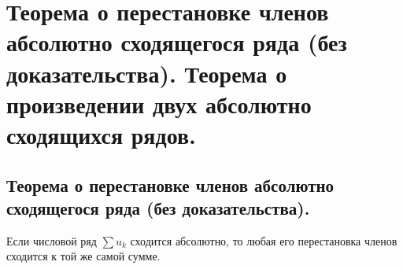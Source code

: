 \section{Теорема о перестановке членов абсолютно сходящегося ряда (без доказательства). Теорема о произведении двух абсолютно сходящихся рядов.}

\subsection{Теорема о перестановке членов абсолютно сходящегося ряда (без доказательства).} \label{transp_theorem}
\begin{theorem}
    Если числовой ряд $\sum u_k$ сходится абсолютно, то любая его перестановка членов сходится к той же самой сумме.
\end{theorem}

